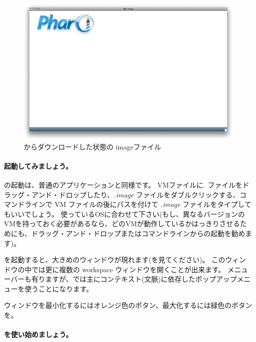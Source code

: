 \documentclass[a4paper,10pt,twoside]{book}
\begin{document}
\begin{figure}[htb]
\centerline {\includegraphics[width=\textwidth]{startup}}
\caption{\pbe からダウンロードした状態の imageファイル}
\end{figure}

\paragraph{起動してみましょう。} \pharo の起動は、普通のアプリケーションと同様です。
VMファイルに\emph{.} ファイルをドラッグ・アンド・ドロップしたり、\emph{.image} ファイルをダブルクリックする、コマンドラインで VM ファイルの後にパスを付けて \emph{.image} ファイルをタイプしてもいいでしょう。
使っているOSに合わせて下さい(もし、異なるバージョンのVMを持っておく必要があるなら、どのVMが動作しているかはっきりさせるためにも、ドラッグ・アンド・ドロップまたはコマンドラインからの起動を勧めます)。

\pharo を起動すると、大きめのウィンドウが現れます(を見てください)。
このウィンドウの中では更に複数の workspace ウィンドウを開くことが出来ます。
メニューバーも有りますが、\pharo では主にコンテキスト(文脈)に依存したポップアップメニューを使うことになります。


ウィンドウを最小化するにはオレンジ色のボタン、最大化するには緑色のボタンを。

\paragraph{\pharo を使い始めましょう。}
\end{document}
